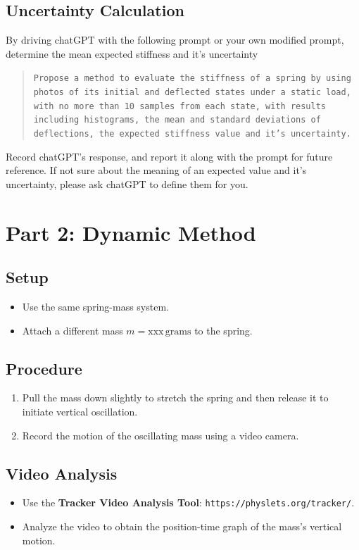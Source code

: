 \documentclass[12pt,a4paper]{article}
\begin{document}
\subsection*{Uncertainty Calculation}
By driving chatGPT with the following prompt or your own modified prompt, determine the mean expected stiffness and it's uncertainty 
\begin{quote}
    \texttt{Propose a method to evaluate the stiffness of a spring by using photos of its initial and deflected states under a static load, with no more than 10 samples from each state, with results including histograms, the mean and standard deviations of deflections, the expected stiffness value and it's uncertainty.}
\end{quote}
Record chatGPT's response, and report it along with the prompt for future reference. If not sure about the meaning of an expected value and it's uncertainty, please ask chatGPT to define them for you. 

\section*{Part 2: Dynamic Method}

\subsection*{Setup}
\begin{itemize}
    \item Use the same spring-mass system.
    \item Attach a different mass \( m = \text{xxx} \, \text{grams} \) to the spring.
\end{itemize}

\subsection*{Procedure}
\begin{enumerate}
    \item Pull the mass down slightly to stretch the spring and then release it to initiate vertical oscillation.
    \item Record the motion of the oscillating mass using a video camera.
\end{enumerate}

\subsection*{Video Analysis}
\begin{itemize}
    \item Use the \textbf{Tracker Video Analysis Tool}: \texttt{https://physlets.org/tracker/}.
    \item Analyze the video to obtain the position-time graph of the mass's vertical motion.
\end{itemize}
\end{document}
